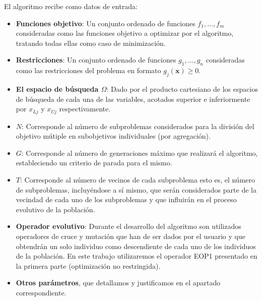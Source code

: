 El algoritmo recibe como datos de entrada:\\
\begin{itemize}
    \item \textbf{Funciones objetivo}: Un conjunto ordenado de funciones $f_1, \dots, f_m$  consideradas como las funciones objetivo a optimizar por el algoritmo, tratando todas ellas como caso de minimización.\\
    
    \item \textbf{Restricciones}: Un conjunto ordenado de funciones $g_1, \dots, g_n$  consideradas como las restricciones del problema en formato $g_j(\boldsymbol{x})\geq 0$.\\
    
     \item \textbf{El espacio de búsqueda $\Omega$}: Dado por el producto cartesiano de los espacios de búsqueda de cada una de las variables, acotados superior e inferiormente por $x_{Lj}$ y $x_{Uj}$ respectivamente.\\

	\item \textbf{$N$}: Corresponde al número de subproblemas considerados para la división del objetivo mútiple en subobjetivos individuales (por agregación).\\
	
	\item \textbf{$G$}: Corresponde al número de generaciones máximo que realizará el algoritmo, estableciendo un criterio de parada para el mismo.\\
	  
    \item \textbf{$T$}: Corresponde al número de vecinos de cada subproblema esto es, el número de subproblemas, incluyéndose a sí mismo, que serán considerados parte de la vecindad de cada uno de los subproblemas y que influirán en el proceso evolutivo de la población.\\
    
	\item \textbf{Operador evolutivo}: Durante el desarrollo del algoritmo son utilizados operadores de cruce y mutación que han de ser dados por el usuario y que obtendrán un solo individuo como descendiente de cada uno de los individuos de la población. En este trabajo utilizaremos el operador EOP1 presentado en la primera parte (optimización no restringida).\\
    
	\item \textbf{Otros parámetros}, que detallamos y justificamos en el apartado correspondiente.\\
\end{itemize}

